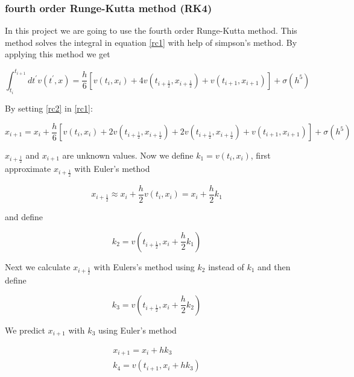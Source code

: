 \documentclass[10pt,a4paper]{article}
\begin{document}
\subsubsection{fourth order Runge-Kutta method (RK4)}
\label{subsubsec:rc4}

In this project we are going to use the fourth order Runge-Kutta method. This method solves the integral in equation \eqref{rc1} with help of simpson's method. By applying this method we get

\begin{equation}
\label{rc2}
\int_{t_i}^{t_{i+1}} dt^{'} v(t^{'}, x) = \frac{h}{6} [v(t_i, x_i) +4 v(t_{i+\frac{1}{2}}, x_{i+\frac{1}{2}}) + v(t_{i+1}, x_{i+1})] + \sigma(h^5)
\end{equation}

By setting \eqref{rc2} in \eqref{rc1}:

\begin{equation}
\label{rc3}
x_{i+1} = x_i + \frac{h}{6} [v(t_i, x_i) + 2 v(t_{i+\frac{1}{2}}, x_{i+\frac{1}{2}}) + 2 v(t_{i+\frac{1}{2}}, x_{i+\frac{1}{2}}) + v(t_{i+1}, x_{i+1})] + \sigma(h^5)
\end{equation}

$x_{i+\frac{1}{2}}$ and $x_{i+1}$ are unknown values. Now we define $k_1 = v(t_i, x_i)$, first approximate $x_{i+\frac{1}{2}}$ with Euler's method

\begin{equation}
\label{s:rc4}
x_{i+\frac{1}{2}} \approx x_i + \frac{h}{2} v(t_i, x_i) = x_i + \frac{h}{2} k_1
\end{equation}

and define

\begin{equation}
\label{rc5}
k_2 = v(t_{i+\frac{1}{2}}, x_i + \frac{h}{2} k_1)
\end{equation}

Next we calculate $x_{i + \frac{1}{2}}$ with Eulers's method using $k_2$ instead of $k_1$ and then define

\begin{equation}
\label{rc6}
k_3 =  v(t_{i+\frac{1}{2}}, x_i+\frac{h}{2} k_2)
\end{equation}

We predict $x_{i+1}$ with $k_3$ using Euler's method

\begin{align}
x_{i+1} = x_i + h k_3 \\
k_4 = v(t_{i+1}, x_i + h k_3)
\end{align}
\end{document}
